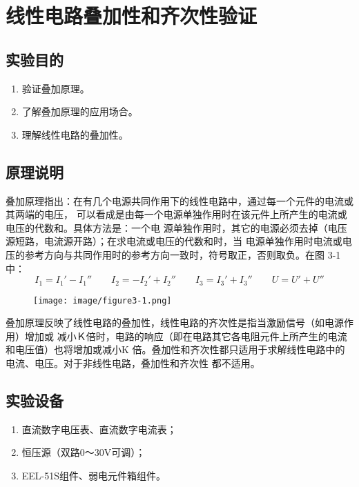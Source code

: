 \documentclass[UTF8]{article}
\begin{document}
    \section{线性电路叠加性和齐次性验证}
        \subsection{实验目的}
            \begin{enumerate}[label=\textbf{\arabic*}.]
                \item 验证叠加原理。
                \item 了解叠加原理的应用场合。 
                \item 理解线性电路的叠加性。
            \end{enumerate}
        \subsection{原理说明}
            \noindent\hspace{2em}叠加原理指出：在有几个电源共同作用下的线性电路中，通过每一个元件的电流或其两端的电压，
            可以看成是由每一个电源单独作用时在该元件上所产生的电流或电压的代数和。具体方法是：一个电
            源单独作用时，其它的电源必须去掉（电压源短路，电流源开路）；在求电流或电压的代数和时，当
            电源单独作用时电流或电压的参考方向与共同作用时的参考方向一致时，符号取正，否则取负。在图
            3-1中： 
            $$I_1 = I_1' - I_1'' \qquad I_2 = -I_2' + I_2'' \qquad I_3 = I_3' + I_3'' \qquad U = U' + U''$$
            \begin{figure}[H]
                \centering
                \texttt{[image: image/figure3-1.png]}
                \caption{}
            \end{figure}
            \par
            \noindent\hspace{2em}叠加原理反映了线性电路的叠加性，线性电路的齐次性是指当激励信号（如电源作用）增加或
            减小Ｋ倍时，电路的响应（即在电路其它各电阻元件上所产生的电流和电压值）也将增加或减小K
            倍。叠加性和齐次性都只适用于求解线性电路中的电流、电压。对于非线性电路，叠加性和齐次性
            都不适用。
        \subsection{实验设备}
            \begin{enumerate}[label=\textbf{\arabic*}.]
                \item 直流数字电压表、直流数字电流表；
                \item 恒压源（双路0～30V可调）； 
                \item EEL-51S组件、弱电元件箱组件。
            \end{enumerate}
\end{document}
